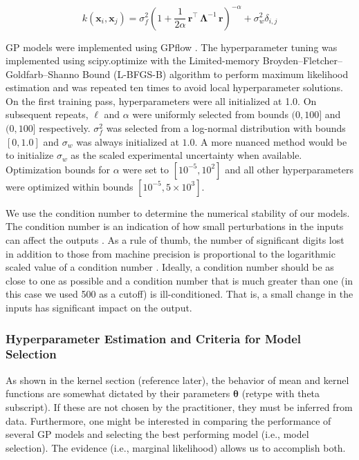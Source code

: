 \documentclass[journal=jacsat,manuscript=article]{achemso}
\newcommand{\kjtodo}[1]{{\color{red} (#1)}}
\newcommand{\xvec}{\ensuremath{\mathbf{x}}}
\begin{document}
{\begin{equation}
    k(\xvec_i,\xvec_j) = \sigma_f^2 \left(1 +\frac{1}{2 \alpha} \,\mathbf{r}^\intercal \,\boldsymbol{\Lambda}^{-1} \,\mathbf{r} \right)^{-\alpha} + \sigma_w^2\delta_{i,j} 
    \label{kernel_final}
\end{equation} 

GP models were implemented using GPflow \cite{Matthews2017GPflow:TensorFlow}. The hyperparameter tuning was implemented using scipy.optimize \cite{Virtanen2020SciPyPython} with the Limited-memory Broyden–Fletcher–Goldfarb–Shanno Bound (L-BFGS-B) algorithm to perform maximum likelihood estimation and was repeated ten times to avoid local hyperparameter solutions. On the first training pass, hyperparameters were all initialized at 1.0. On subsequent repeats, $\ell$ and $\alpha$ were uniformly selected from bounds $(0, 100]$ and $(0, 100]$ respectively. $\sigma^2_f$ was selected from a log-normal distribution with bounds $[0,1.0]$ and $\sigma_w$ was always initialized at $1.0$. A more nuanced method would be to initialize $\sigma_w$ as the scaled experimental uncertainty when available. Optimization bounds for $\alpha$ were set to $[10^{-5}, 10^2]$ and all other hyperparameters were optimized within bounds $[10^{-5}, 5\times 10^3]$.

We use the condition number to determine the numerical stability of our models. The condition number is an indication of how small perturbations in the inputs can affect the outputs \cite{Foster2009}. As a rule of thumb, the number of significant digits lost in addition to those from machine precision is proportional to the logarithmic scaled value of a condition number \cite{NumMathComput}. Ideally, a condition number should be as close to one as possible and a condition number that is much greater than one (in this case we used 500 as a cutoff) is ill-conditioned. That is, a small change in the inputs has significant impact on the output.

\subsubsection{Hyperparameter Estimation and Criteria for Model Selection}
As shown in the kernel section \kjtodo{reference later}, the behavior of mean and kernel functions are somewhat dictated by their parameters $\boldsymbol{\theta}$ \kjtodo{retype with theta subscript}. If these are not chosen by the practitioner, they must be inferred from data. Furthermore, one might be interested in comparing the performance of several GP models and selecting the best performing model (i.e., model selection). The evidence (i.e., marginal likelihood) allows us to accomplish both.

}
\end{document}
